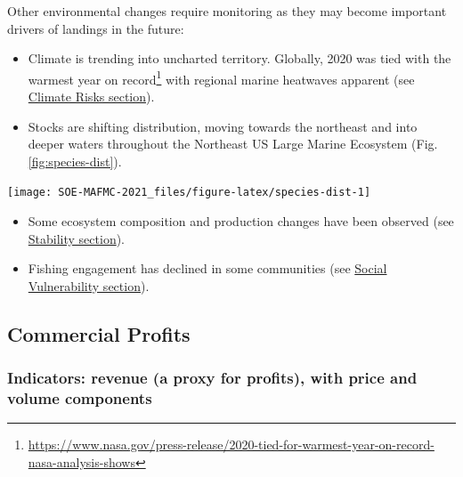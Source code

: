 \documentclass[
  10pt,
]{article}
\providecommand{\tightlist}{%
  \setlength{\itemsep}{0pt}\setlength{\parskip}{0pt}}
\let\origfigure\figure
\let\endorigfigure\endfigure
\renewenvironment{figure}[1][2] {
    \expandafter\origfigure\expandafter[H]
} {
    \endorigfigure
}
\begin{document}
Other environmental changes require monitoring as they may become
important drivers of landings in the future:

\begin{itemize}
\tightlist
\item
  Climate is trending into uncharted territory. Globally, 2020 was tied
  with the warmest year on record\footnote{\url{https://www.nasa.gov/press-release/2020-tied-for-warmest-year-on-record-nasa-analysis-shows}}
  with regional marine heatwaves apparent (see
  \protect\hyperlink{climate-and-ecosystem-productivity}{Climate Risks
  section}).\\
\item
  Stocks are shifting distribution, moving towards the northeast and
  into deeper waters throughout the Northeast US Large Marine Ecosystem
  (Fig. \ref{fig:species-dist}).
\end{itemize}

\begin{figure}

{\centering \texttt{[image: SOE-MAFMC-2021\_files/figure-latex/species-dist-1]} 

}

\caption{Aggregate species distribution metrics for species in the Northeast Large Marine Ecosystem.}\label{fig:species-dist}
\end{figure}

\begin{itemize}
\tightlist
\item
  Some ecosystem composition and production changes have been observed
  (see \protect\hyperlink{stability}{Stability section}).
\item
  Fishing engagement has declined in some communities (see
  \protect\hyperlink{social-vulnerability}{Social Vulnerability
  section}).
\end{itemize}

\hypertarget{commercial-profits}{%
\subsection{Commercial Profits}\label{commercial-profits}}

\hypertarget{indicators-revenue-a-proxy-for-profits-with-price-and-volume-components}{%
\subsubsection{Indicators: revenue (a proxy for profits), with price and
volume
components}\label{indicators-revenue-a-proxy-for-profits-with-price-and-volume-components}}
\end{document}
